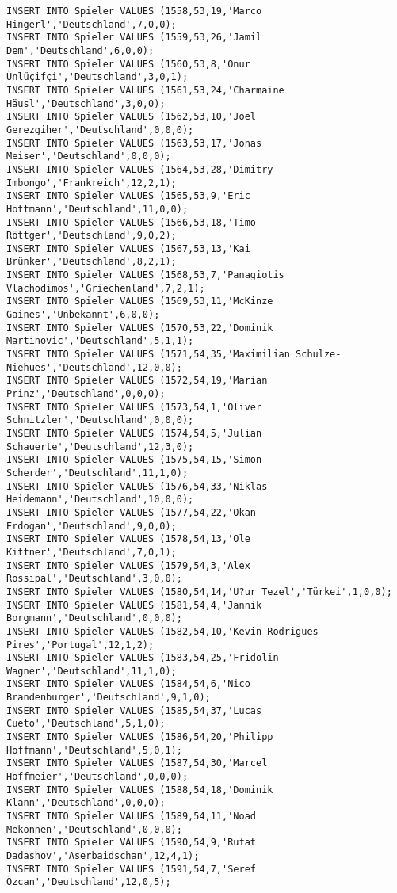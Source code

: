 \documentclass{bschlangaul-aufgabe}
\begin{document}
\begin{verbatim}
INSERT INTO Spieler VALUES (1558,53,19,'Marco Hingerl','Deutschland',7,0,0);
INSERT INTO Spieler VALUES (1559,53,26,'Jamil Dem','Deutschland',6,0,0);
INSERT INTO Spieler VALUES (1560,53,8,'Onur Ünlüçifçi','Deutschland',3,0,1);
INSERT INTO Spieler VALUES (1561,53,24,'Charmaine Häusl','Deutschland',3,0,0);
INSERT INTO Spieler VALUES (1562,53,10,'Joel Gerezgiher','Deutschland',0,0,0);
INSERT INTO Spieler VALUES (1563,53,17,'Jonas Meiser','Deutschland',0,0,0);
INSERT INTO Spieler VALUES (1564,53,28,'Dimitry Imbongo','Frankreich',12,2,1);
INSERT INTO Spieler VALUES (1565,53,9,'Eric Hottmann','Deutschland',11,0,0);
INSERT INTO Spieler VALUES (1566,53,18,'Timo Röttger','Deutschland',9,0,2);
INSERT INTO Spieler VALUES (1567,53,13,'Kai Brünker','Deutschland',8,2,1);
INSERT INTO Spieler VALUES (1568,53,7,'Panagiotis Vlachodimos','Griechenland',7,2,1);
INSERT INTO Spieler VALUES (1569,53,11,'McKinze Gaines','Unbekannt',6,0,0);
INSERT INTO Spieler VALUES (1570,53,22,'Dominik Martinovic','Deutschland',5,1,1);
INSERT INTO Spieler VALUES (1571,54,35,'Maximilian Schulze-Niehues','Deutschland',12,0,0);
INSERT INTO Spieler VALUES (1572,54,19,'Marian Prinz','Deutschland',0,0,0);
INSERT INTO Spieler VALUES (1573,54,1,'Oliver Schnitzler','Deutschland',0,0,0);
INSERT INTO Spieler VALUES (1574,54,5,'Julian Schauerte','Deutschland',12,3,0);
INSERT INTO Spieler VALUES (1575,54,15,'Simon Scherder','Deutschland',11,1,0);
INSERT INTO Spieler VALUES (1576,54,33,'Niklas Heidemann','Deutschland',10,0,0);
INSERT INTO Spieler VALUES (1577,54,22,'Okan Erdogan','Deutschland',9,0,0);
INSERT INTO Spieler VALUES (1578,54,13,'Ole Kittner','Deutschland',7,0,1);
INSERT INTO Spieler VALUES (1579,54,3,'Alex Rossipal','Deutschland',3,0,0);
INSERT INTO Spieler VALUES (1580,54,14,'U?ur Tezel','Türkei',1,0,0);
INSERT INTO Spieler VALUES (1581,54,4,'Jannik Borgmann','Deutschland',0,0,0);
INSERT INTO Spieler VALUES (1582,54,10,'Kevin Rodrigues Pires','Portugal',12,1,2);
INSERT INTO Spieler VALUES (1583,54,25,'Fridolin Wagner','Deutschland',11,1,0);
INSERT INTO Spieler VALUES (1584,54,6,'Nico Brandenburger','Deutschland',9,1,0);
INSERT INTO Spieler VALUES (1585,54,37,'Lucas Cueto','Deutschland',5,1,0);
INSERT INTO Spieler VALUES (1586,54,20,'Philipp Hoffmann','Deutschland',5,0,1);
INSERT INTO Spieler VALUES (1587,54,30,'Marcel Hoffmeier','Deutschland',0,0,0);
INSERT INTO Spieler VALUES (1588,54,18,'Dominik Klann','Deutschland',0,0,0);
INSERT INTO Spieler VALUES (1589,54,11,'Noad Mekonnen','Deutschland',0,0,0);
INSERT INTO Spieler VALUES (1590,54,9,'Rufat Dadashov','Aserbaidschan',12,4,1);
INSERT INTO Spieler VALUES (1591,54,7,'Seref Özcan','Deutschland',12,0,5);

\end{verbatim}
\end{document}
